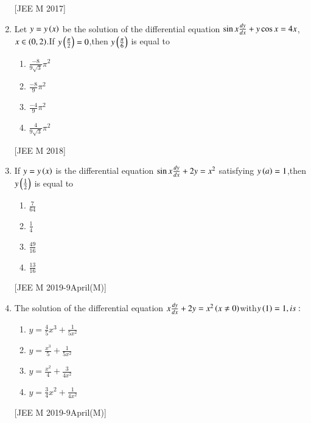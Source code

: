 \documentclass[journal]{IEEEtran}
\begin{document}
\begin{enumerate}
\begin{multicols}{2}
\begin{enumerate}
 \end{enumerate}
\end{multicols}
\hfill
{[JEE M 2017]}


\item Let $ y=y\left(x\right)$ be the solution of the differential equation $\sin{x}\frac{d{y}}{d{x}}+y\cos{x}=4x$,$x\in\left(0,2\right)$.If $y\left(\frac{\pi}{2}\right)=0$,then $y\left(\frac{\pi}{6}\right)$ is equal to
\begin{multicols}{2}
 \begin{enumerate}
    \item $ \frac{-8}{9\sqrt{3}}\pi^2$
    \item $ \frac{-8}{9}\pi^2$
    \item $\frac{-4}{9}\pi^2$
    \item $ \frac{4}{9\sqrt{3}}\pi^2 $
 \end{enumerate}
\end{multicols}
\hfill
{[JEE M 2018]}
\item If $ y=y\left(x\right)$ is the differential equation $ \sin{x}\frac{d{y}}{d{x}}+2y=x^2$ satisfying $y\left(a\right)=1$,then $y\left(\frac{1}{2}\right)$ is equal to
\begin{multicols}{2}
 \begin{enumerate}
    \item $ \frac{7}{64}$

    
    \item $ \frac{1}{4}$

    
    \item $ \frac{49}{16}$
    
    \item $ \frac{13}{16}$
    
    
 \end{enumerate}
\end{multicols}
\hfill
{[JEE M 2019-9April(M)]}
\item The solution of the differential equation $ x\frac{d{y}}{d{x}}+2y=x^2 \left(x\neq0\right)$with$ y\left(1\right)=1,is:$
\begin{multicols}{2}
 \begin{enumerate}
    \item $ y=\frac{4}{5}x^3+\frac{1}{5x^2}$

    \item $ y=\frac{x^3}{5}+\frac{1}{5x^2}$
    \item $ y=\frac{x^2}{4}+\frac{3}{4x^2}$
    \item $ y=\frac{3}{4}x^2+\frac{1}{4x^2}$
  \end{enumerate}
\end{multicols}
\hfill
{[JEE M 2019-9April(M)]}


\end{enumerate}
\end{document}
